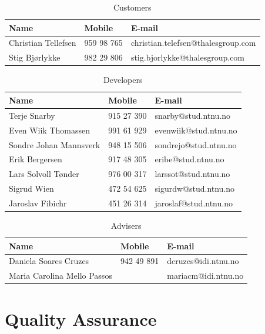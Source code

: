 \begin{table}[!ht] \footnotesize \center
\caption{Customers\label{tab:part_cust}}
\begin{tabular}{l l l}
	\toprule
	Name & Mobile & E-mail \\ 
	\midrule
	Christian Tellefsen & 959 98 765 & christian.telefsen@thalesgroup.com \\ 
	Stig Bjørlykke & 982 29 806 & stig.bjorlykke@thalesgroup.com \\ 
	\bottomrule
\end{tabular}
\end{table}

\begin{table}[!ht] \footnotesize \center
\caption{Developers\label{tab:part_dev}}
\begin{tabular}{l l l}
	\toprule
	Name & Mobile & E-mail  \\ 
	\midrule
	Terje Snarby & 915 27 390 & snarby@stud.ntnu.no \\ 
	Even Wiik Thomassen & 991 61 929 & evenwiik@stud.ntnu.no \\ 
	Sondre Johan Mannsverk & 948 15 506 & sondrejo@stud.ntnu.no \\ 
	Erik Bergersen & 917 48 305 & eribe@stud.ntnu.no \\ 
	Lars Solvoll Tønder & 976 00 317 & larssot@stud.ntnu.no \\ 
	Sigrud Wien & 472 54 625 & sigurdw@stud.ntnu.no \\ 
	Jaroslav Fibichr & 451 26 314 & jaroslaf@stud.ntnu.no \\ 
	\bottomrule
\end{tabular}
\end{table}

\begin{table}[!ht] \footnotesize \center
\caption{Advisers\label{tab:part_adv}}
\begin{tabular}{l l l}
	\toprule
	Name & Mobile & E-mail  \\ 
	\midrule
	Daniela Soares Cruzes & 942 49 891 & dcruzes@idi.ntnu.no \\ 
	Maria Carolina Mello Passos & & mariacm@idi.ntnu.no \\ 
	\bottomrule
\end{tabular}
\end{table}

\section{Quality Assurance}

